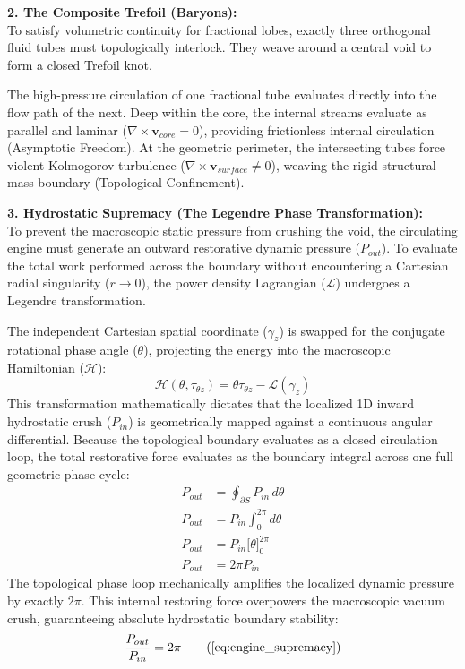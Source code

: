 \documentclass[11pt, a4paper]{article}
\begin{document}
\textbf{2. The Composite Trefoil (Baryons):} \\
To satisfy volumetric continuity for fractional lobes, exactly three orthogonal fluid tubes must topologically interlock. They weave around a central void to form a closed Trefoil knot. 

The high-pressure circulation of one fractional tube evaluates directly into the flow path of the next. Deep within the core, the internal streams evaluate as parallel and laminar ($\nabla \times \mathbf{v}_{core} = 0$), providing frictionless internal circulation (Asymptotic Freedom). At the geometric perimeter, the intersecting tubes force violent Kolmogorov turbulence ($\nabla \times \mathbf{v}_{surface} \neq 0$), weaving the rigid structural mass boundary (Topological Confinement).

\textbf{3. Hydrostatic Supremacy (The Legendre Phase Transformation):} \\
To prevent the macroscopic static pressure from crushing the void, the circulating engine must generate an outward restorative dynamic pressure ($P_{out}$). To evaluate the total work performed across the boundary without encountering a Cartesian radial singularity ($r \to 0$), the power density Lagrangian ($\mathcal{L}$) undergoes a Legendre transformation. 

The independent Cartesian spatial coordinate ($\gamma_z$) is swapped for the conjugate rotational phase angle ($\theta$), projecting the energy into the macroscopic Hamiltonian ($\mathcal{H}$):
\begin{equation}
    \mathcal{H}(\theta, \tau_{\theta z}) = \theta \tau_{\theta z} - \mathcal{L}(\gamma_z) \label{eq:power_legendre}
\end{equation}
This transformation mathematically dictates that the localized 1D inward hydrostatic crush ($P_{in}$) is geometrically mapped against a continuous angular differential. Because the topological boundary evaluates as a closed circulation loop, the total restorative force evaluates as the boundary integral across one full geometric phase cycle:
\begin{align}
    P_{out} &= \oint_{\partial S} P_{in} \, d\theta  \\
    P_{out} &= P_{in} \int_{0}^{2\pi} d\theta \nonumber \\
    P_{out} &= P_{in} \Big[ \theta \Big]_{0}^{2\pi} \nonumber \\
    P_{out} &= 2\pi P_{in} \nonumber
\end{align}
The topological phase loop mechanically amplifies the localized dynamic pressure by exactly $2\pi$. This internal restoring force overpowers the macroscopic vacuum crush, guaranteeing absolute hydrostatic boundary stability:
\begin{equation}
    \frac{P_{out}}{P_{in}} = 2\pi \tag{\ref{eq:engine_supremacy}}
\end{equation}
\end{document}
